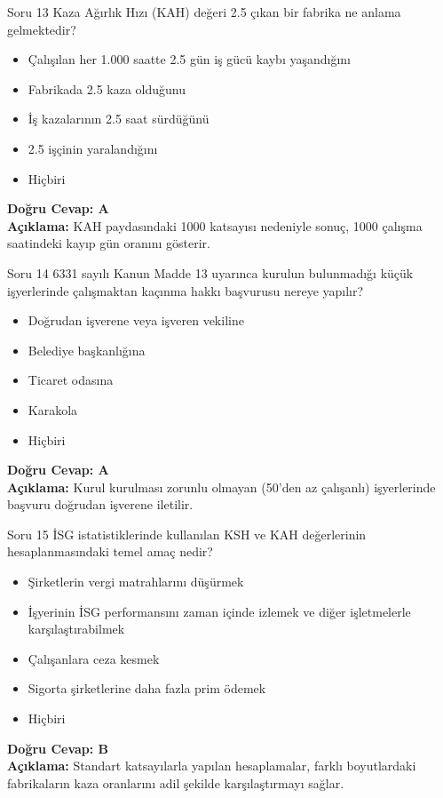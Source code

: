 \documentclass[12pt,a4paper]{article}
\begin{document}
\begin{testcard}{Soru 13}
    Kaza Ağırlık Hızı (KAH) değeri 2.5 çıkan bir fabrika ne anlama gelmektedir?
    \begin{itemize}
        \item[A)] Çalışılan her 1.000 saatte 2.5 gün iş gücü kaybı yaşandığını
        \item[B)] Fabrikada 2.5 kaza olduğunu
        \item[C)] İş kazalarının 2.5 saat sürdüğünü
        \item[D)] 2.5 işçinin yaralandığını
        \item[E)] Hiçbiri
    \end{itemize}
    \tcblower
    \textbf{Doğru Cevap: A} \\
    \textbf{Açıklama:} KAH paydasındaki 1000 katsayısı nedeniyle sonuç, 1000 çalışma saatindeki kayıp gün oranını gösterir.
\end{testcard}

\begin{testcard}{Soru 14}
    6331 sayılı Kanun Madde 13 uyarınca kurulun bulunmadığı küçük işyerlerinde çalışmaktan kaçınma hakkı başvurusu nereye yapılır?
    \begin{itemize}
        \item[A)] Doğrudan işverene veya işveren vekiline
        \item[B)] Belediye başkanlığına
        \item[C)] Ticaret odasına
        \item[D)] Karakola
        \item[E)] Hiçbiri
    \end{itemize}
    \tcblower
    \textbf{Doğru Cevap: A} \\
    \textbf{Açıklama:} Kurul kurulması zorunlu olmayan (50'den az çalışanlı) işyerlerinde başvuru doğrudan işverene iletilir.
\end{testcard}

\begin{testcard}{Soru 15}
    İSG istatistiklerinde kullanılan KSH ve KAH değerlerinin hesaplanmasındaki temel amaç nedir?
    \begin{itemize}
        \item[A)] Şirketlerin vergi matrahlarını düşürmek
        \item[B)] İşyerinin İSG performansını zaman içinde izlemek ve diğer işletmelerle karşılaştırabilmek
        \item[C)] Çalışanlara ceza kesmek
        \item[D)] Sigorta şirketlerine daha fazla prim ödemek
        \item[E)] Hiçbiri
    \end{itemize}
    \tcblower
    \textbf{Doğru Cevap: B} \\
    \textbf{Açıklama:} Standart katsayılarla yapılan hesaplamalar, farklı boyutlardaki fabrikaların kaza oranlarını adil şekilde karşılaştırmayı sağlar.
\end{testcard}
\end{document}
